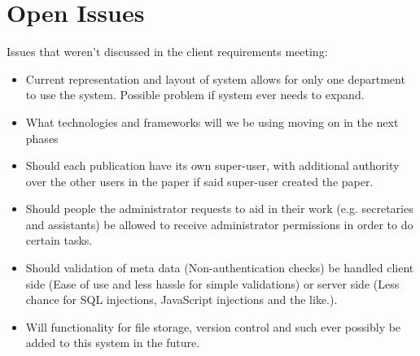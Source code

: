 \documentclass{article}
\begin{document}
	\section{Open Issues}\label{sec:issues}
	Issues that weren't discussed in the client requirements meeting:
		\begin{itemize}
		  \item Current representation and layout of system allows for only one department to use the system. Possible problem if system ever needs to expand.
		  \item What technologies and frameworks will we be using moving on in the next phases
		  \item Should each publication have its own super-user, with additional authority over the other users in the paper if said super-user created the paper.
		  \item Should people the administrator requests to aid in their work (e.g. secretaries and assistants) be allowed to receive administrator permissions in order to do certain tasks.
		  \item Should validation of meta data (Non-authentication checks) be handled client side (Ease of use and less hassle for simple validations) or server side (Less chance for SQL injections, JavaScript injections and the like.).
		  \item Will functionality for file storage, version control and such ever possibly be added to this system in the future.
		\end{itemize}
		
\end{document}
